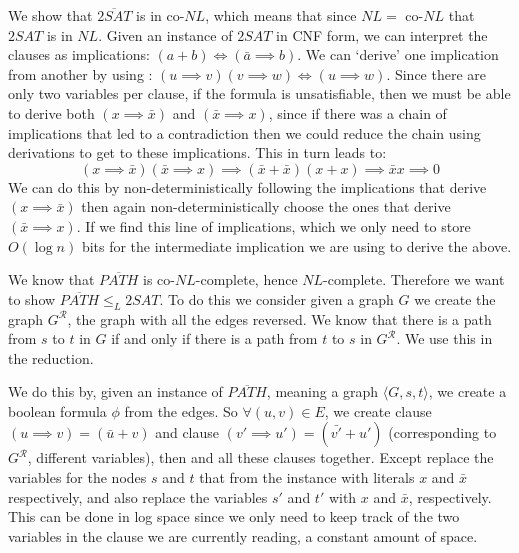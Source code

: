 \documentclass[english]{article}
\begin{document}
We show that $\overline{2SAT}$ is in co-$NL$, which means that since $NL =$ co-$NL$ that $2SAT$ is in $NL$. Given
an instance of $2SAT$ in CNF form, we can interpret the clauses as implications: $(a + b) \iff (\bar{a} \implies b)$.
We can `derive' one implication from another by using : $(u \implies v)(v \implies w) \iff (u \implies w)$.
Since there are only two variables per clause, if the formula is unsatisfiable, then we must be able to derive both
$(x \implies \bar{x})$ and $(\bar{x} \implies x)$, since if there was a chain of implications that led to a 
contradiction then we could reduce the chain using derivations to get to these implications.
This in turn leads to:
\[ (x \implies \bar{x})(\bar{x} \implies x) 
\implies (\bar{x} + \bar{x})(x + x) 
\implies \bar{x}x \implies 0 
\]
We can do this by non-deterministically following the implications that derive $(x \implies \bar{x})$ then again
non-deterministically choose the ones that derive $(\bar{x} \implies x)$. If we find this line of implications, 
which we only need to store $O(\log n)$ bits for the intermediate implication we are using to derive the above.

We know that $\overline{PATH}$ is co-$NL$-complete, hence $NL$-complete. Therefore we want to show
$\overline{PATH} \le_L 2SAT$. To do this we consider given a graph $G$ we create the graph $G^\mathcal{R}$, the
graph with all the edges reversed. We know that there is a path from $s$ to $t$ in $G$ if and only if there is a
path from $t$ to $s$ in $G^\mathcal{R}$. We use this in the reduction. 

We do this by, given an instance of $\overline{PATH}$, meaning a graph $\langle G, s, t \rangle$, we create a boolean
formula $\phi$ from the edges. So $\forall (u,v) \in E$, we create clause $(u \implies v) = (\bar{u} + v)$ and clause
$(v' \implies u') = (\bar{v'} + u')$ (corresponding to $G^\mathcal{R}$, different variables), then and all these
clauses together. Except replace the variables for the nodes $s$ and $t$ that from the instance with literals $x$ and
$\bar{x}$ respectively, and also replace the variables $s'$ and $t'$ with $x$ and $\bar{x}$, respectively.
This can be done in log space since we only need to keep track of the two variables in the clause we are currently
reading, a constant amount of space. 
\end{document}
